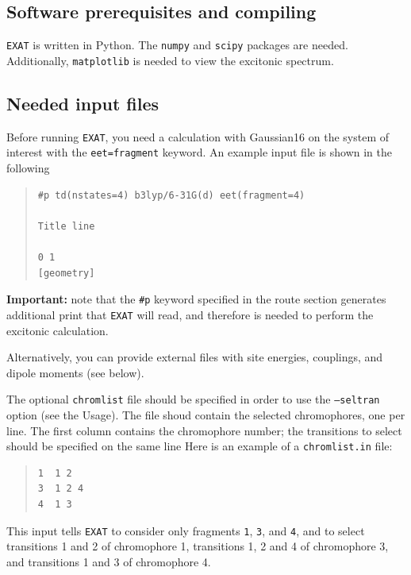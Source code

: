 \documentclass[a4paper,11pt]{article}
\begin{document}
\subsection{Software prerequisites and compiling}

\texttt{EXAT} is written in Python. The \texttt{numpy} and \texttt{scipy} packages are needed. Additionally, \texttt{matplotlib} is needed to view the excitonic spectrum.  


\subsection{Needed input files}\label{sec:input}

Before running \texttt{EXAT}, you need a calculation with Gaussian16 on the system of interest with the \texttt{eet=fragment} keyword. An example input file is shown in the following
\begin{quote}
\begin{verbatim}
#p td(nstates=4) b3lyp/6-31G(d) eet(fragment=4)

Title line

0 1 
[geometry]

\end{verbatim}
\end{quote}

\textbf{Important:} note that the \texttt{\#p} keyword specified in the route section generates additional print that \texttt{EXAT} will read, and therefore is needed to perform the excitonic calculation.

Alternatively, you can provide external files with site energies, couplings, and dipole moments (see below).

The optional \texttt{chromlist} file should be specified in order to use the \texttt{--seltran} option (see the Usage). The file shoud contain the selected chromophores, one per line. The first column contains the chromophore number; the transitions to select should be specified on the same line Here is an example of a \texttt{chromlist.in} file:

\begin{quote}
\begin{verbatim}
1  1 2
3  1 2 4
4  1 3
\end{verbatim}
\end{quote}

This input tells \texttt{EXAT} to consider only fragments \texttt{1}, \texttt{3}, and \texttt{4}, and to select transitions 1 and 2 of chromophore 1, transitions 1, 2 and 4 of chromophore 3, and transitions 1 and 3 of chromophore 4.
\end{document}
